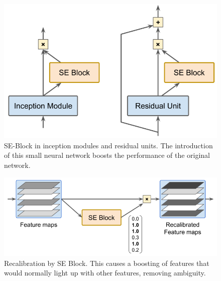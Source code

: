 \documentclass[12pt,a4paper]{article}
\begin{document}
\begin{figure}
  \centering
  \includegraphics[width=.5\linewidth]{Images/SEBlock.png}
  \caption[SE-Block in inception modules and residual units]{SE-Block in inception modules and residual units. The introduction of this small neural network boosts the performance of the original network. }
  \label{fig:seblock}
\end{figure}
\begin{figure}
  \centering
  \includegraphics[width=.5\linewidth]{Images/seblock_recalibration.png}
  \caption[Recalibration by SE Block]{Recalibration by SE Block. This causes a boosting of features that would normally light up with other features, removing ambiguity.}
  \label{fig:seblock_recal}
\end{figure}
\end{document}
